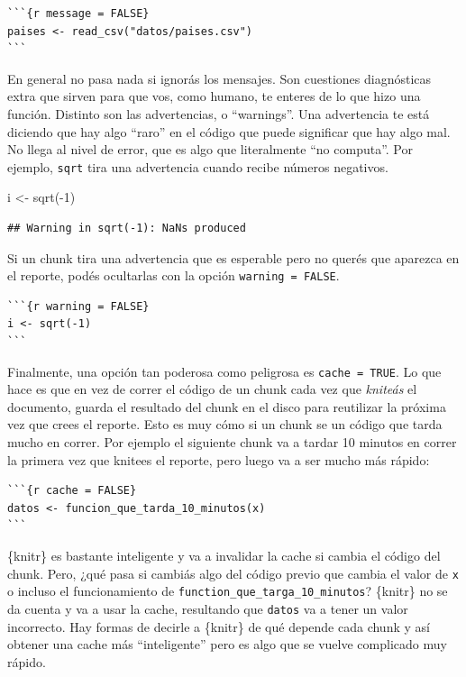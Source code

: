\documentclass[
  openany]{book}
\newenvironment{Shaded}{\begin{snugshade}}{\end{snugshade}}
\newcommand{\DecValTok}[1]{\textcolor[rgb]{0.00,0.00,0.81}{#1}}
\newcommand{\FunctionTok}[1]{\textcolor[rgb]{0.00,0.00,0.00}{#1}}
\newcommand{\NormalTok}[1]{#1}
\newcommand{\OtherTok}[1]{\textcolor[rgb]{0.56,0.35,0.01}{#1}}
\newcommand{\SpecialCharTok}[1]{\textcolor[rgb]{0.00,0.00,0.00}{#1}}
\begin{document}
\begin{verbatim}
```{r message = FALSE}
paises <- read_csv("datos/paises.csv")
```
\end{verbatim}

En general no pasa nada si ignorás los mensajes. Son cuestiones diagnósticas extra que sirven para que vos, como humano, te enteres de lo que hizo una función. Distinto son las advertencias, o ``warnings''. Una advertencia te está diciendo que hay algo ``raro'' en el código que puede significar que hay algo mal. No llega al nivel de error, que es algo que literalmente ``no computa''. Por ejemplo, \texttt{sqrt} tira una advertencia cuando recibe números negativos.

\begin{Shaded}
\begin{Highlighting}[]
\NormalTok{i }\OtherTok{\textless{}{-}} \FunctionTok{sqrt}\NormalTok{(}\SpecialCharTok{{-}}\DecValTok{1}\NormalTok{)}
\end{Highlighting}
\end{Shaded}

\begin{verbatim}
## Warning in sqrt(-1): NaNs produced
\end{verbatim}

Si un chunk tira una advertencia que es esperable pero no querés que aparezca en el reporte, podés ocultarlas con la opción \texttt{warning\ =\ FALSE}.

\begin{verbatim}
```{r warning = FALSE}
i <- sqrt(-1)
```
\end{verbatim}

Finalmente, una opción tan poderosa como peligrosa es \texttt{cache\ =\ TRUE}. Lo que hace es que en vez de correr el código de un chunk cada vez que \emph{kniteás} el documento, guarda el resultado del chunk en el disco para reutilizar la próxima vez que crees el reporte. Esto es muy cómo si un chunk se un código que tarda mucho en correr. Por ejemplo el siguiente chunk va a tardar 10 minutos en correr la primera vez que knitees el reporte, pero luego va a ser mucho más rápido:

\begin{verbatim}
```{r cache = FALSE}
datos <- funcion_que_tarda_10_minutos(x)
```
\end{verbatim}

\{knitr\} es bastante inteligente y va a invalidar la cache si cambia el código del chunk. Pero, ¿qué pasa si cambiás algo del código previo que cambia el valor de \texttt{x} o incluso el funcionamiento de \texttt{function\_que\_targa\_10\_minutos}? \{knitr\} no se da cuenta y va a usar la cache, resultando que \texttt{datos} va a tener un valor incorrecto. Hay formas de decirle a \{knitr\} de qué depende cada chunk y así obtener una cache más ``inteligente'' pero es algo que se vuelve complicado muy rápido.
\end{document}

